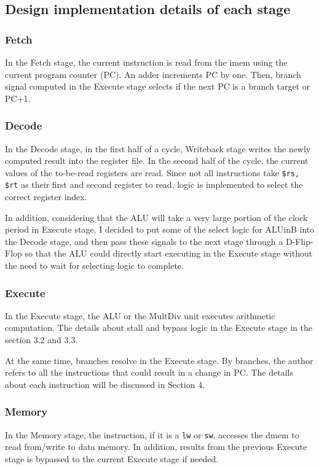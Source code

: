 \documentclass{article}
\begin{document}
\subsection{Design implementation details of each stage}
\subsubsection{Fetch}
In the Fetch stage, the current instruction is read from the imem using the current program counter (PC). An adder increments PC by one. Then, branch signal computed in the Execute stage selects if the next PC is a branch target or PC+1.

\subsubsection{Decode}
In the Decode stage, in the first half of a cycle, Writeback stage writes the newly computed result into the register file. In the second half of the cycle, the current values of the to-be-read registers are read. Since not all instructions take \texttt{\$rs, \$rt} as their first and second register to read, logic is implemented to select the correct register index. \par
In addition, considering that the ALU will take a very large portion of the clock period in Execute stage, I decided to put some of the select logic for ALUinB into the Decode stage, and then pass these signals to the next stage through a D-Flip-Flop so that the ALU could directly start executing in the Execute stage without the need to wait for selecting logic to complete.

\subsubsection{Execute}
In the Execute stage, the ALU or the MultDiv unit executes arithmetic computation. The details about stall and bypass logic in the Execute stage in the section 3.2 and 3.3. \par
At the same time, branches resolve in the Execute stage. By branches, the author refers to all the instructions that could result in a change in PC. The details about each instruction will be discussed in Section 4.

\subsubsection{Memory}
In the Memory stage, the instruction, if it is a \texttt{lw} or \texttt{sw}, accesses the dmem to read from/write to data memory. In addition, results from the previous Execute stage is bypassed to the current Execute stage if needed.
\end{document}

